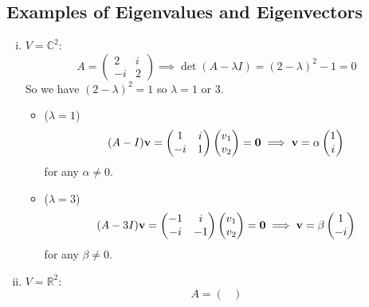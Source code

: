 \documentclass{article}
\begin{document}
\subsection{Examples of Eigenvalues and Eigenvectors}
\begin{enumerate}[(i)]
    \item $V = \mathbb C^2$:
          \[ A = \begin{pmatrix}
                  2 & i \\ -i & 2
              \end{pmatrix} \implies \det(A - \lambda I) = (2-\lambda)^2 - 1 = 0 \]
          So we have $(2 - \lambda)^2 = 1$ so $\lambda = 1$ or 3.
          \begin{itemize}
              \item ($\lambda = 1$)
                    \[ (A - I)\vb v = \begin{pmatrix}
                            1 & i \\ -i & 1
                        \end{pmatrix}\begin{pmatrix}
                            v_1 \\ v_2
                        \end{pmatrix} = \vb 0 \implies \vb v = \alpha\begin{pmatrix}
                            1 \\ i
                        \end{pmatrix} \]
                    for any $\alpha \neq 0$.
              \item ($\lambda = 3$)
                    \[ (A - 3I)\vb v = \begin{pmatrix}
                            -1 & i \\ -i & -1
                        \end{pmatrix}\begin{pmatrix}
                            v_1 \\ v_2
                        \end{pmatrix} = \vb 0 \implies \vb v = \beta\begin{pmatrix}
                            1 \\ -i
                        \end{pmatrix} \]
                    for any $\beta \neq 0$.
          \end{itemize}
    \item $V = \mathbb R^2$:
          \[ A = \begin{pmatrix}

\end{pmatrix}\]
\end{enumerate}
\end{document}
